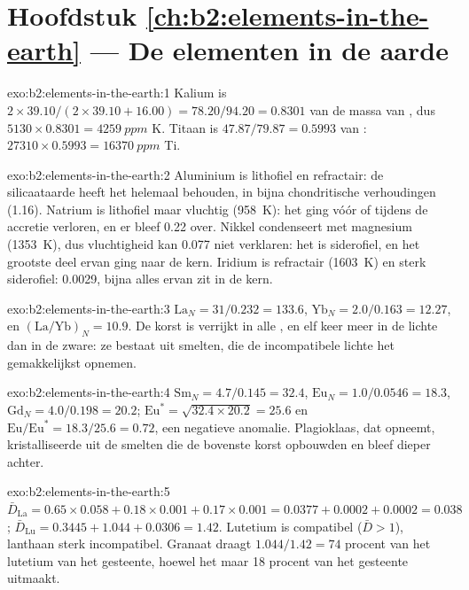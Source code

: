 \section*{Hoofdstuk \ref{ch:b2:elements-in-the-earth} --- De elementen in de aarde}

\begin{solution}{exo:b2:elements-in-the-earth:1}
Kalium is $2\times39.10/(2\times39.10+16.00) = 78.20/94.20 = 0.8301$ van de massa van
, dus $\num{5130}\times0.8301 = \qty{4259}{ppm}$ K. Titaan is
$47.87/79.87 = 0.5993$ van : $\num{27310}\times0.5993 = \qty{16370}{ppm}$ Ti.
\end{solution}

\begin{solution}{exo:b2:elements-in-the-earth:2}
Aluminium is lithofiel en refractair: de silicaataarde heeft het helemaal behouden, in bijna
chondritische verhoudingen (1.16). Natrium is lithofiel maar vluchtig (\qty{958}{K}): het ging
vóór of tijdens de accretie verloren, en er bleef 0.22 over. Nikkel condenseert met magnesium
(\qty{1353}{K}), dus vluchtigheid kan 0.077 niet verklaren: het is siderofiel, en het grootste deel
ervan ging naar de kern. Iridium is refractair (\qty{1603}{K}) en sterk siderofiel:
0.0029, bijna alles ervan zit in de kern.
\end{solution}

\begin{solution}{exo:b2:elements-in-the-earth:3}
$\mathrm{La}_N = 31/0.232 = 133.6$, $\mathrm{Yb}_N = 2.0/0.163 = 12.27$, en
$(\mathrm{La}/\mathrm{Yb})_N = 10.9$. De korst is verrijkt in alle , en
elf keer meer in de lichte dan in de zware: ze bestaat uit smelten, die
de incompatibele lichte  het gemakkelijkst opnemen.
\end{solution}

\begin{solution}{exo:b2:elements-in-the-earth:4}
$\mathrm{Sm}_N = 4.7/0.145 = 32.4$, $\mathrm{Eu}_N = 1.0/0.0546 = 18.3$,
$\mathrm{Gd}_N = 4.0/0.198 = 20.2$; $\mathrm{Eu}^* = \sqrt{32.4\times20.2} = 25.6$ en
$\mathrm{Eu}/\mathrm{Eu}^* = 18.3/25.6 = 0.72$, een negatieve anomalie. Plagioklaas, dat
 opneemt, kristalliseerde uit de smelten die de bovenste korst opbouwden en bleef
dieper achter.
\end{solution}

\begin{solution}{exo:b2:elements-in-the-earth:5}
$\bar D_{\mathrm{La}} = 0.65\times0.058+0.18\times0.001+0.17\times0.001 = 0.0377 +
0.0002 + 0.0002 = 0.038$; $\bar D_{\mathrm{Lu}} = 0.3445+1.044+0.0306 = 1.42$. Lutetium is
compatibel ($\bar D > 1$), lanthaan sterk incompatibel. Granaat draagt
$1.044/1.42 = 74$ procent van het lutetium van het gesteente, hoewel het maar 18 procent van het
gesteente uitmaakt.
\end{solution}

